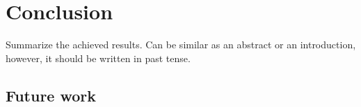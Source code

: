 
\chapter{Conclusion\label{chap:conclusion}}

Summarize the achieved results.
Can be similar as an abstract or an introduction, however, it should be written in past tense.

\section{Future work}